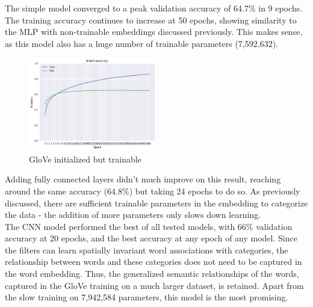 \documentclass[jou,apacite, 10px]{apa6}
\begin{document}
The simple model converged to a peak validation accuracy of 64.7\% in 9 epochs. The training accuracy continues to increase at 50 epochs, showing similarity to the MLP with non-trainable embeddings discussed previously. This makes sense, as this model also has a huge number of trainable parameters (7,592,632).\\

\begin{figure}[h!]
\captionsetup{justification=centering}
    \centering
     \includegraphics[width=0.5\textwidth]{images/Training-GloveTrainable}
        \caption{GloVe initialized but trainable}
\end{figure}

Adding fully connected layers didn't much improve on this result, reaching around the same accuracy (64.8\%) but taking 24 epochs to do so. As previously discussed, there are sufficient trainable parameters in the embedding to categorize the data - the addition of more parameters only slows down learning.\\

The CNN model performed the best of all tested models, with 66\% validation accuracy at 20 epochs, and the best accuracy at any epoch of any model. Since the filters can learn spatially invariant word associations with categories, the relationship between words and these categories does not need to be captured in the word embedding. Thus, the generalized semantic relationships of the words, captured in the GloVe training on a much larger dataset, is retained. Apart from the slow training on 7,942,584 parameters, this model is the most promising.\\
\end{document}
